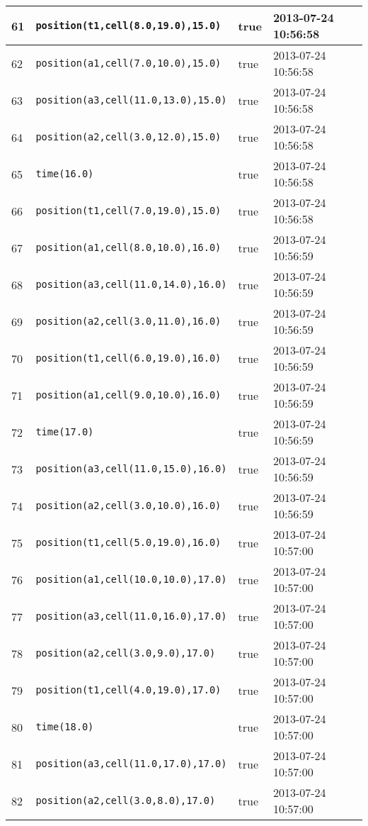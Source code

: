 \documentclass[11pt]{article}\usepackage[utf8]{inputenc}\usepackage{geometry}
\begin{document}
\begin{table}[ht]
\begin{tabular}{l l l l}
61&\texttt{position(t1,cell(8.0,19.0),15.0)}&true&2013-07-24 10:56:58\\ [1ex] \hline
62&\texttt{position(a1,cell(7.0,10.0),15.0)}&true&2013-07-24 10:56:58\\ [1ex] \hline
63&\texttt{position(a3,cell(11.0,13.0),15.0)}&true&2013-07-24 10:56:58\\ [1ex] \hline
64&\texttt{position(a2,cell(3.0,12.0),15.0)}&true&2013-07-24 10:56:58\\ [1ex] \hline
65&\texttt{time(16.0)}&true&2013-07-24 10:56:58\\ [1ex] \hline
66&\texttt{position(t1,cell(7.0,19.0),15.0)}&true&2013-07-24 10:56:58\\ [1ex] \hline
67&\texttt{position(a1,cell(8.0,10.0),16.0)}&true&2013-07-24 10:56:59\\ [1ex] \hline
68&\texttt{position(a3,cell(11.0,14.0),16.0)}&true&2013-07-24 10:56:59\\ [1ex] \hline
69&\texttt{position(a2,cell(3.0,11.0),16.0)}&true&2013-07-24 10:56:59\\ [1ex] \hline
70&\texttt{position(t1,cell(6.0,19.0),16.0)}&true&2013-07-24 10:56:59\\ [1ex] \hline
71&\texttt{position(a1,cell(9.0,10.0),16.0)}&true&2013-07-24 10:56:59\\ [1ex] \hline
72&\texttt{time(17.0)}&true&2013-07-24 10:56:59\\ [1ex] \hline
73&\texttt{position(a3,cell(11.0,15.0),16.0)}&true&2013-07-24 10:56:59\\ [1ex] \hline
74&\texttt{position(a2,cell(3.0,10.0),16.0)}&true&2013-07-24 10:56:59\\ [1ex] \hline
75&\texttt{position(t1,cell(5.0,19.0),16.0)}&true&2013-07-24 10:57:00\\ [1ex] \hline
76&\texttt{position(a1,cell(10.0,10.0),17.0)}&true&2013-07-24 10:57:00\\ [1ex] \hline
77&\texttt{position(a3,cell(11.0,16.0),17.0)}&true&2013-07-24 10:57:00\\ [1ex] \hline
78&\texttt{position(a2,cell(3.0,9.0),17.0)}&true&2013-07-24 10:57:00\\ [1ex] \hline
79&\texttt{position(t1,cell(4.0,19.0),17.0)}&true&2013-07-24 10:57:00\\ [1ex] \hline
80&\texttt{time(18.0)}&true&2013-07-24 10:57:00\\ [1ex] \hline
81&\texttt{position(a3,cell(11.0,17.0),17.0)}&true&2013-07-24 10:57:00\\ [1ex] \hline
82&\texttt{position(a2,cell(3.0,8.0),17.0)}&true&2013-07-24 10:57:00\\ [1ex] \hline

\end{tabular}
\end{table}
\end{document}
